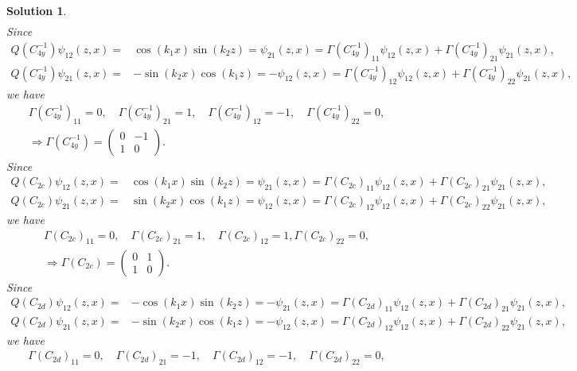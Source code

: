 \documentclass[UTF8,10pt,a4paper]{article}
\theoremstyle{Problem}
\theoremstyle{Solution}
\newtheorem*{sol}{Solution}
\begin{document}
\begin{sol}
\begin{gather}
    \end{gather}
    Since
    \begin{align}
        Q(C_{4y}^{-1})\psi_{12}(z,x)=&\cos(k_1x)\sin(k_2z)=\psi_{21}(z,x)=\Gamma(C_{4y}^{-1})_{11}\psi_{12}(z,x)+\Gamma(C_{4y}^{-1})_{21}\psi_{21}(z,x),\\
        Q(C_{4y}^{-1})\psi_{21}(z,x)=&-\sin(k_2x)\cos(k_1z)=-\psi_{12}(z,x)=\Gamma(C_{4y}^{-1})_{12}\psi_{12}(z,x)+\Gamma(C_{4y}^{-1})_{22}\psi_{21}(z,x),
    \end{align}
    we have
    \begin{gather}
        \Gamma(C_{4y}^{-1})_{11}=0,\quad\Gamma(C_{4y}^{-1})_{21}=1,\quad\Gamma(C_{4y}^{-1})_{12}=-1,\quad\Gamma(C_{4y}^{-1})_{22}=0,\\
        \Longrightarrow\Gamma(C_{4y}^{-1})=\left(\begin{matrix}
            0&-1\\
            1&0
        \end{matrix}\right).
    \end{gather}
    Since
    \begin{align}
        Q(C_{2c})\psi_{12}(z,x)=&\cos(k_1x)\sin(k_2z)=\psi_{21}(z,x)=\Gamma(C_{2c})_{11}\psi_{12}(z,x)+\Gamma(C_{2c})_{21}\psi_{21}(z,x),\\
        Q(C_{2c})\psi_{21}(z,x)=&\sin(k_2x)\cos(k_1z)=\psi_{12}(z,x)=\Gamma(C_{2c})_{12}\psi_{12}(z,x)+\Gamma(C_{2c})_{22}\psi_{21}(z,x),
    \end{align}
    we have
    \begin{gather}
        \Gamma(C_{2c})_{11}=0,\quad\Gamma(C_{2c})_{21}=1,\quad\Gamma(C_{2c})_{12}=1,\Gamma(C_{2c})_{22}=0,\\
        \Longrightarrow\Gamma(C_{2c})=\left(\begin{matrix}
            0&1\\
            1&0
        \end{matrix}\right).
    \end{gather}
    Since
    \begin{align}
        Q(C_{2d})\psi_{12}(z,x)=&-\cos(k_1x)\sin(k_2z)=-\psi_{21}(z,x)=\Gamma(C_{2d})_{11}\psi_{12}(z,x)+\Gamma(C_{2d})_{21}\psi_{21}(z,x),\\
        Q(C_{2d})\psi_{21}(z,x)=&-\sin(k_2x)\cos(k_1z)=-\psi_{12}(z,x)=\Gamma(C_{2d})_{12}\psi_{12}(z,x)+\Gamma(C_{2d})_{22}\psi_{21}(z,x),
    \end{align}
    we have
    \begin{gather}
        \Gamma(C_{2d})_{11}=0,\quad\Gamma(C_{2d})_{21}=-1,\quad\Gamma(C_{2d})_{12}=-1,\quad\Gamma(C_{2d})_{22}=0,\\

\end{gather}
\end{sol}
\end{document}
